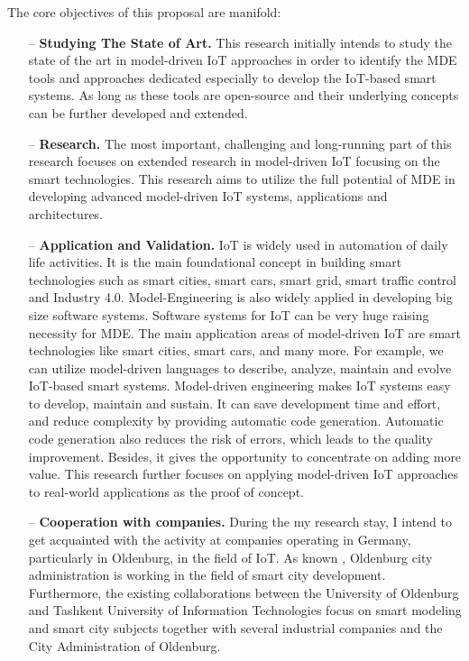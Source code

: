 \documentclass[10pt, oneside]{article}
\begin{document}
The core objectives of this proposal are manifold:
\begin{itemize}
\item[--] \textbf{Studying The State of Art.} This research initially intends to study the state of the art in model-driven IoT approaches in order to identify the MDE tools and approaches dedicated especially to develop the IoT-based smart systems. As long as these tools are open-source and their underlying concepts can be further developed and extended. 
\item[--] \textbf{Research.} The most important, challenging and long-running part of this research focuses on extended research in model-driven IoT focusing on the smart technologies. This research aims to utilize the full potential of MDE in developing advanced model-driven IoT systems, applications and architectures.
\item[--] \textbf{Application and Validation.} IoT is widely used in automation of daily life activities. It is the main foundational concept in building smart technologies such as smart cities, smart cars, smart grid, smart traffic control and Industry 4.0. Model-Engineering is also widely applied in developing big size software systems. Software systems for IoT can be very huge raising necessity for MDE. The main application areas of model-driven IoT are smart technologies like smart cities, smart cars, and many more. For example, we can utilize model-driven languages to describe, analyze, maintain and evolve IoT-based smart systems. Model-driven engineering makes IoT systems easy to develop, maintain and sustain. It can save development time and effort, and reduce complexity by providing automatic code generation. Automatic code generation also reduces the risk of errors, which leads to the quality improvement. Besides, it gives the opportunity to concentrate on adding more value. This research further focuses on applying model-driven IoT approaches to real-world applications as the proof of concept.
\item[--] \textbf{Cooperation with companies.} During the my research stay, I intend to get acquainted with the activity at companies operating in Germany, particularly in Oldenburg, in the field of IoT. As known \cite{Stadt+Oldenburg}, Oldenburg city administration is working in the field of smart city development. Furthermore, the existing collaborations between the University of Oldenburg and Tashkent University of Information Technologies focus on smart modeling and smart city subjects together with several industrial companies and the City Administration of Oldenburg.
\end{itemize}
\end{document}
